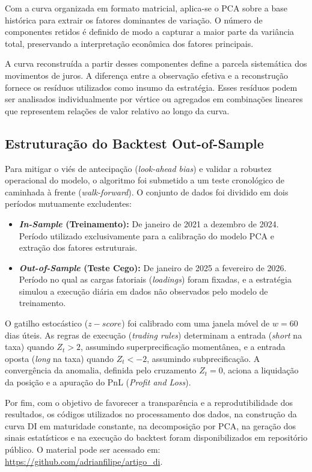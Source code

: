 \documentclass[fleqn]{rbfin}
\begin{document}
Com a curva organizada em formato matricial, aplica-se o PCA sobre a base histórica para extrair os fatores dominantes de variação. O número de componentes retidos é definido de modo a capturar a maior parte da variância total, preservando a interpretação econômica dos fatores principais.

A curva reconstruída a partir desses componentes define a parcela sistemática dos movimentos de juros. A diferença entre a observação efetiva e a reconstrução fornece os resíduos utilizados como insumo da estratégia. Esses resíduos podem ser analisados individualmente por vértice ou agregados em combinações lineares que representem relações de valor relativo ao longo da curva.

\subsection{Estruturação do Backtest Out-of-Sample}

Para mitigar o viés de antecipação (\textit{look-ahead bias}) e validar a robustez operacional do modelo, o algoritmo foi submetido a um teste cronológico de caminhada à frente (\textit{walk-forward}). O conjunto de dados foi dividido em dois períodos mutuamente excludentes:

\begin{itemize}
    \item \textbf{\textit{In-Sample} (Treinamento):} De janeiro de 2021 a dezembro de 2024. Período utilizado exclusivamente para a calibração do modelo PCA e extração dos fatores estruturais.
    \item \textbf{\textit{Out-of-Sample} (Teste Cego):} De janeiro de 2025 a fevereiro de 2026. Período no qual as cargas fatoriais (\textit{loadings}) foram fixadas, e a estratégia simulou a execução diária em dados não observados pelo modelo de treinamento.
\end{itemize}

O gatilho estocástico ($z-score$) foi calibrado com uma janela móvel de $w = 60$ dias úteis. As regras de execução (\textit{trading rules}) determinam a entrada (\textit{short} na taxa) quando $Z_t > 2$, assumindo superprecificação momentânea, e a entrada oposta (\textit{long} na taxa) quando $Z_t < -2$, assumindo subprecificação. A convergência da anomalia, definida pelo cruzamento $Z_t = 0$, aciona a liquidação da posição e a apuração do PnL (\textit{Profit and Loss}).


Por fim, com o objetivo de favorecer a transparência e a reprodutibilidade dos resultados, os códigos utilizados no processamento dos dados, na construção da curva DI em maturidade constante, na decomposição por PCA, na geração dos sinais estatísticos e na execução do backtest foram disponibilizados em repositório público. O material pode ser acessado em: \url{https://github.com/adrianfilipe/artigo_di}.
\end{document}
